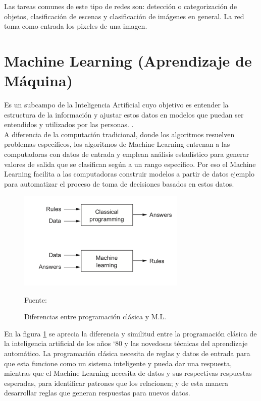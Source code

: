 Las tareas comunes de este tipo de redes son: detección o categorización de objetos, clasificación de escenas y clasificación de imágenes en general. La red toma como entrada los pixeles de una imagen. 

\section{Machine Learning (Aprendizaje de Máquina)}
Es un subcampo de la Inteligencia Artificial cuyo objetivo es entender la estructura de la información y ajustar estos datos en modelos que puedan ser entendidos y utilizados por las personas. \cite{digitalocean:machinelearning}.\\

A diferencia de la computación tradicional, donde los algoritmos resuelven problemas específicos, los algoritmos de Machine Learning entrenan a las computadoras con datos de entrada y emplean análisis estadístico para generar valores de salida que se clasifican según a un rango específico. Por eso el Machine Learning facilita a las computadoras construir modelos a partir de datos ejemplo para automatizar el proceso de toma de decisiones basados en estos datos.\\

\begin{figure}[H]
    \begin{center}
        \includegraphics[width=8cm]{img/capitulo_2/machinelearning.png}
        \caption{Diferencias entre programación clásica y M.L.\\}Fuente: \cite{classicprog_and_ml}
        \label{fig:classical_ml}
    \end{center}
\end{figure}

En la figura \ref{fig:classical_ml} se aprecia la diferencia y similitud entre la programación clásica de la inteligencia artificial de los años `80 y las novedosas técnicas del aprendizaje automático. La programación clásica necesita de reglas y datos de entrada para que esta funcione como un sistema inteligente y pueda dar una respuesta, mientras que el Machine Learning necesita de datos y sus respectivas respuestas esperadas, para identificar patrones que los relacionen; y de esta manera  desarrollar reglas que generan respuestas para nuevos datos.

